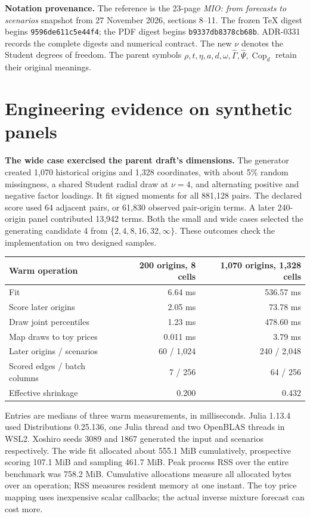 \documentclass[11pt,letterpaper]{article}
\newcommand{\sect}[1]{\section*{\color{ink}#1}}
\newcommand{\lead}[1]{\textbf{\textcolor{accent}{#1}}}
\newcommand{\Cop}{\operatorname{Cop}}
\begin{document}
\lead{Notation provenance.} The reference is the 23-page \emph{MIO: from forecasts to scenarios} snapshot from 27 November 2026, sections 8--11. The frozen TeX digest begins \texttt{9596de611c5e44f4}; the PDF digest begins \texttt{b9337db8378cb68b}. ADR-0331 records the complete digests and numerical contract. The new \(\nu\) denotes the Student degrees of freedom. The parent symbols \(\rho,t,\eta,a,d,\omega,\widehat\Gamma,\widehat\Psi,\Cop_d\) retain their original meanings.
\newpage
\sect{Engineering evidence on synthetic panels}
\lead{The wide case exercised the parent draft's dimensions.} The generator created 1,070 historical origins and 1,328 coordinates, with about 5\% random missingness, a shared Student radial draw at \(\nu=4\), and alternating positive and negative factor loadings. It fit signed moments for all 881,128 pairs. The declared score used 64 adjacent pairs, or 61,830 observed pair-origin terms. A later 240-origin panel contributed 13,942 terms. Both the small and wide cases selected the generating candidate 4 from \(\{2,4,8,16,32,\infty\}\). These outcomes check the implementation on two designed samples.

\begin{center}
\begin{tabular}{@{}lrr@{}}\toprule
Warm operation & 200 origins, 8 cells & 1,070 origins, 1,328 cells\\
\midrule
Fit & 6.64 ms & 536.57 ms\\
Score later origins & 2.05 ms & 73.78 ms\\
Draw joint percentiles & 1.23 ms & 478.60 ms\\
Map draws to toy prices & 0.011 ms & 3.79 ms\\
\midrule
Later origins / scenarios & 60 / 1,024 & 240 / 2,048\\
Scored edges / batch columns & 7 / 256 & 64 / 256\\
Effective shrinkage & 0.200 & 0.432\\
\bottomrule
\end{tabular}
\end{center}
Entries are medians of three warm measurements, in milliseconds. Julia 1.13.4 used Distributions 0.25.136, one Julia thread and two OpenBLAS threads in WSL2. Xoshiro seeds 3089 and 1867 generated the input and scenarios respectively. The wide fit allocated about 555.1 MiB cumulatively, prospective scoring 107.1 MiB and sampling 461.7 MiB. Peak process RSS over the entire benchmark was 758.2 MiB. Cumulative allocations measure all allocated bytes over an operation; RSS measures resident memory at one instant. The toy price mapping uses inexpensive scalar callbacks; the actual inverse mixture forecast can cost more.
\end{document}
